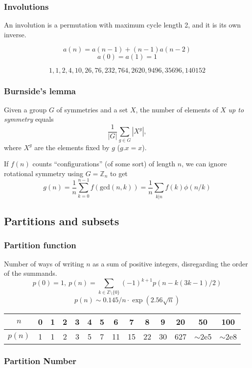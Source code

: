 {  \subsubsection{Involutions}
  An involution is a permutation with maximum cycle length 2, and it is its own inverse.

  \[
  a(n) = a(n - 1) + (n - 1)a(n - 2)
  \]
  \[
  a(0) = a(1) = 1
  \]
  
  \[
  1, 1, 2, 4, 10, 26, 76, 232, 764, 2620, 9496, 35696, 140152
  \]
  \subsubsection{Burnside's lemma}
    Given a group $G$ of symmetries and a set $X$, the number of elements of $X$ \emph{up to symmetry} equals
     \[ {\frac {1}{|G|}}\sum _{{g\in G}}|X^{g}|, \]
     where $X^{g}$ are the elements fixed by $g$ ($g.x = x$).

     If $f(n)$ counts ``configurations'' (of some sort) of length $n$, we can ignore rotational symmetry using $G = \mathbb Z_n$ to get
     \[ g(n) = \frac 1 n \sum_{k=0}^{n-1}{f(\text{gcd}(n, k))} = \frac 1 n \sum_{k|n}{f(k)\phi(n/k)} \]

\subsection{Partitions and subsets}
  \subsubsection{Partition function}
    Number of ways of writing $n$ as a sum of positive integers, disregarding the order of the summands.
    \[ p(0) = 1,\ p(n) = \sum_{k \in \mathbb Z \setminus \{0\}}{(-1)^{k+1} p(n - k(3k-1) / 2)} \]
    \[ p(n) \sim 0.145 / n \cdot \exp(2.56 \sqrt{n}) \]

    \begin{center}
    \begin{tabular}{c|c@{\ }c@{\ }c@{\ }c@{\ }c@{\ }c@{\ }c@{\ }c@{\ }c@{\ }c@{\ }c@{\ }c@{\ }c}
      $n$    & 0 & 1 & 2 & 3 & 4 & 5 & 6  & 7  & 8  & 9  & 20  & 50  & 100 \\ \hline
      $p(n)$ & 1 & 1 & 2 & 3 & 5 & 7 & 11 & 15 & 22 & 30 & 627 & $\mathtt{\sim}$2e5 & $\mathtt{\sim}$2e8 \\
    \end{tabular}
    \end{center}

  \subsubsection{Partition Number}

}
